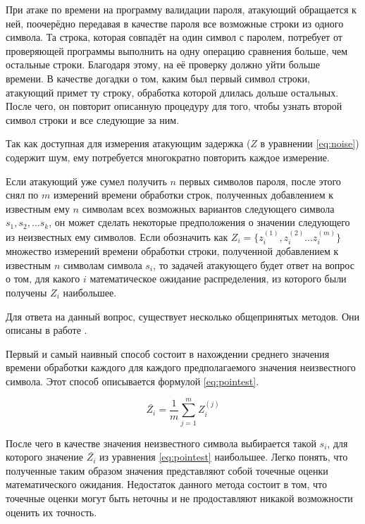 При атаке по времени на программу валидации пароля, атакующий обращается к
ней, поочерёдно передавая в качестве пароля все возможные строки из одного
символа. Та строка, которая совпадёт на один символ с паролем, потребует от
проверяющей программы выполнить на одну операцию сравнения больше, чем остальные
строки. Благодаря этому, на её проверку должно уйти больше времени. В качестве
догадки о том, каким был первый символ строки, атакующий примет ту строку,
обработка которой длилась дольше остальных. После чего, он повторит описанную
процедуру для того, чтобы узнать второй символ строки и все следующие за ним.

Так как доступная для измерения атакующим задержка ($Z$ в уравнении
\ref{eq:noise}) содержит шум, ему потребуется многократно повторить каждое
измерение.

Если атакующий уже сумел получить $n$ первых символов пароля, после этого
снял по $m$ измерений времени обработки строк, полученных добавлением к
известным ему $n$ символам всех возможных вариантов следующего символа $s_1,
s_2, ... s_k$, он может сделать некоторые предположения о значении следующего
из неизвестных ему символов. Если обозначить как $Z_i = \{ z_i^{(1)}, z_i^{(2)} ... z_i^{(m)}
\}$ множество измерений времени обработки строки, полученной добавлением к
известным $n$ символам символа $s_i$, то задачей атакующего будет ответ на
вопрос о том, для какого $i$ математическое ожидание распределения, из которого
были получены $Z_i$ наибольшее.

Для ответа на данный вопрос, существует несколько общепринятых методов. Они
описаны в работе \cite{anmodel}.

Первый и самый наивный способ состоит в
нахождении среднего значения времени обработки каждого для каждого предполагаемого
значения неизвестного символа. Этот способ описывается формулой \ref{eq:pointest}.

\nopagebreak

\begin{equation} \label{eq:pointest}
\bar{Z_i} = \frac{1}{m} \sum_{j=1}^m Z_i^{(j)}
\end{equation}

После чего в качестве значения неизвестного символа выбирается такой $s_i$, для
которого значение $\bar{Z_i}$ из уравнения \ref{eq:pointest} наибольшее. Легко
понять, что полученные таким образом значения представляют собой точечные оценки
математического ожидания. Недостаток данного метода состоит в том, что точечные
оценки могут быть неточны и не продоставляют никакой возможности оценить их
точность.

